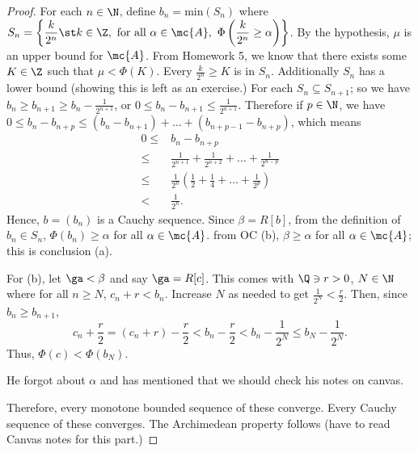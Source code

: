 \begin{proof}
	For each \(n\in\N\), define \(b_n=\text{min}(S_n)\) where \(S_n=\left\{\displaystyle\frac{k}{2^n}\st k\in\Z,~\text{for all}~\alpha\in\mc{A},~\Phi\left(\displaystyle\frac{k}{2^n}\geq\alpha\right)\right\}\). By the hypothesis, \(\mu\) is an upper bound for \(\mc{A}\). From Homework 5, we know that there exists some \(K\in\Z\) such that \(\mu<\Phi(K)\). Every \(\displaystyle\frac{k}{2^n}\geq K\) is in \(S_n\). Additionally \(S_n\) has a lower bound (showing this is left as an exercise.) For each \(S_{n}\subseteq S_{n+1}\); so we have \(b_n\geq b_{n+1}\geq b_n-\displaystyle\frac{1}{2^{n+1}}\), or \(0\leq b_n-b_{n+1}\leq\displaystyle\frac{1}{2^{n+1}}\). Therefore if \(p\in\N\), we have \(0\leq b_n-b_{n+p}\leq (b_n-b_{n+1})+\dots +(b_{n+p-1}-b_{n+p})\), which means
	\begin{align*}
		0\leq&b_n-b_{n+p}\\
		\leq& \frac{1}{2^{n+1}}+\frac{1}{2^{n+2}}+\dots+\frac{1}{2^{n-p}}\\
		\leq&\frac{1}{2^n}\left(\frac{1}{2}+\frac{1}{4}+\dots+\frac{1}{2^p}\right)\\
		<&\frac{1}{2^n}.
	\end{align*}
	Hence, \(b=(b_n)\) is a Cauchy sequence. Since \(\beta=R[b]\), from the definition of \(b_n\in S_n\), \(\Phi(b_n)\geq \alpha\) for all \(\alpha\in\mc{A}\). from OC (b), \(\beta\geq\alpha\) for all \(\alpha\in\mc{A}\); this is conclusion (a).
	
	\medskip
	
	For (b), let \(\ga<\beta\) and say \(\ga=R[c]\). This comes with \(\Q\ni r>0\), \(N\in\N\) where for all \(n\geq N\), \(c_n+r<b_n\). Increase \(N\) as needed to get \(\displaystyle\frac{1}{2^N}<\frac{r}{2}\). Then, since \(b_n\geq b_{n+1}\), 
	\begin{equation*}
		c_n+\frac{r}{2}=(c_n+r)-\frac{r}{2}<b_n-\frac{r}{2}<b_n-\frac{1}{2^N}\leq b_N-\frac{1}{2^N}.
	\end{equation*}
	Thus, \(\Phi(c)<\Phi(b_N)\).
	\begin{note}
		He forgot about \(\alpha\) and has mentioned that we should check his notes on canvas.
	\end{note}
	Therefore, every monotone bounded sequence of these converge. Every Cauchy sequence of these converges. The Archimedean property follows (have to read Canvas notes for this part.)
\end{proof}